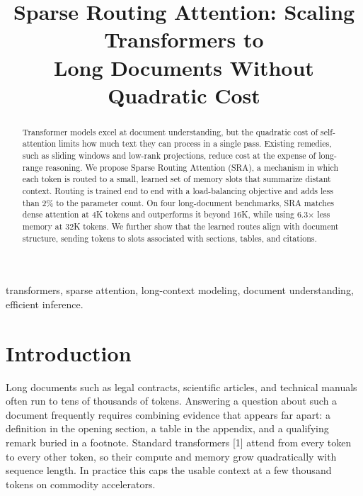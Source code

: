 \documentclass[conference,letterpaper]{IEEEtran}
\begin{document}
\title{Sparse Routing Attention: Scaling Transformers to\\Long Documents Without Quadratic Cost}

\author{
}

\maketitle

\begin{abstract}
Transformer models excel at document understanding, but the quadratic cost of self-attention limits how much text they can process in a single pass. Existing remedies, such as sliding windows and low-rank projections, reduce cost at the expense of long-range reasoning. We propose Sparse Routing Attention (SRA), a mechanism in which each token is routed to a small, learned set of memory slots that summarize distant context. Routing is trained end to end with a load-balancing objective and adds less than 2\% to the parameter count. On four long-document benchmarks, SRA matches dense attention at 4K tokens and outperforms it beyond 16K, while using 6.3$\times$ less memory at 32K tokens. We further show that the learned routes align with document structure, sending tokens to slots associated with sections, tables, and citations.
\end{abstract}

\begin{IEEEkeywords}
transformers, sparse attention, long-context modeling, document understanding, efficient inference.
\end{IEEEkeywords}

\section{Introduction}

Long documents such as legal contracts, scientific articles, and technical manuals often run to tens of thousands of tokens. Answering a question about such a document frequently requires combining evidence that appears far apart: a definition in the opening section, a table in the appendix, and a qualifying remark buried in a footnote. Standard transformers [1] attend from every token to every other token, so their compute and memory grow quadratically with sequence length. In practice this caps the usable context at a few thousand tokens on commodity accelerators.
\end{document}
